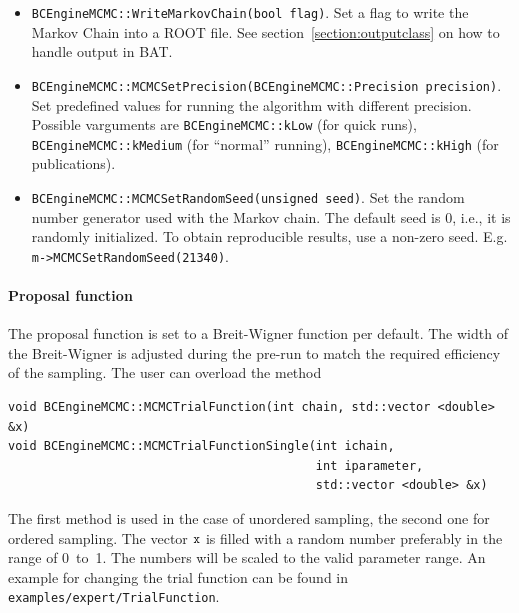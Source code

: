 \documentclass[11pt, a4paper]{article}
\begin{document}
\begin{itemize}
\item \verb|BCEngineMCMC::WriteMarkovChain(bool flag)|. Set a flag to
 write the Markov Chain into a ROOT file. See
 section~\ref{section:outputclass} on how to handle output in BAT.

\item
  \verb|BCEngineMCMC::MCMCSetPrecision(BCEngineMCMC::Precision precision)|. Set
  predefined values for running the algorithm with different
  precision. Possible varguments are \linebreak \verb|BCEngineMCMC::kLow| (for
  quick runs), \verb|BCEngineMCMC::kMedium| (for ``normal'' running),
  \linebreak \verb|BCEngineMCMC::kHigh| (for publications).

  \item \verb|BCEngineMCMC::MCMCSetRandomSeed(unsigned seed)|. Set  the
  random number generator used with the Markov chain. The default seed is 0,
  i.e., it is randomly initialized. To obtain reproducible results, use a
  non-zero seed. E.g.  \verb|m->MCMCSetRandomSeed(21340)|.
\end{itemize}

\paragraph{Proposal function}

The proposal function is set to a Breit-Wigner function per
default. The width of the Breit-Wigner is adjusted during the pre-run
to match the required efficiency of the sampling. The user can
overload the method
%
\begin{verbatim}
void BCEngineMCMC::MCMCTrialFunction(int chain, std::vector <double> &x)
void BCEngineMCMC::MCMCTrialFunctionSingle(int ichain,
                                           int iparameter,
                                           std::vector <double> &x)
\end{verbatim}

The first method is used in the case of unordered sampling, the second
one for ordered sampling. The vector $\verb|x|$ is filled with a
random number preferably in the range of 0~to~1. The numbers will be
scaled to the valid parameter range. An example for changing the trial
function can be found in \verb|examples/expert/TrialFunction|.

\end{document}
